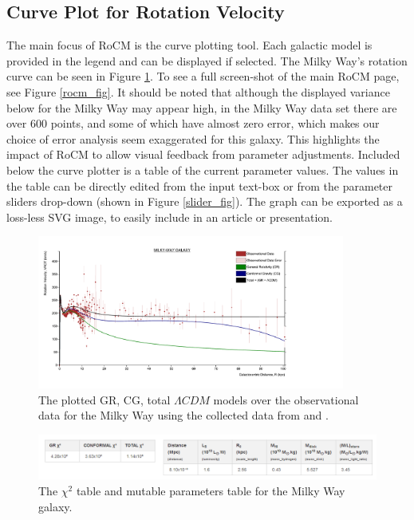\documentclass[conference]{IEEEtran-modified}
\begin{document}
\subsection{Curve Plot for Rotation Velocity}
The main focus of RoCM is the curve plotting tool. Each galactic model is provided in the legend and can be displayed if selected. The Milky Way's rotation curve can be seen in Figure \ref{milkywayplot}. To see a full screen-shot of the main RoCM page, see Figure \ref{rocm_fig}. It should be noted that although the displayed variance below for the Milky Way may appear high, in the Milky Way data set \cite{sofue} there are over 600 points, and some of which have almost zero error, which makes our choice of error analysis seem exaggerated for this galaxy. This highlights the impact of RoCM to allow visual feedback from parameter adjustments. Included below the curve plotter is a table of the current parameter values. The values in the table can be directly edited from the input text-box or from the parameter sliders drop-down (shown in Figure \ref{slider_fig}). The graph can be exported as a loss-less SVG image, to easily include in an article or presentation.

\begin{figure}[h!]
\centering
\includegraphics[width=0.9\textwidth]{MILKY-WAY}
\caption{The plotted GR, CG, total $\Lambda CDM$ models over the observational data for the Milky Way using the collected data from \cite{kundu} and \cite{sofue}.}
\label{milkywayplot}
\end{figure}

\begin{figure}[h!]
\centering
\includegraphics[width=\textwidth]{MILKY-WAY-CHI-PARAMS}
\caption{The $\chi^2$ table and mutable parameters table for the Milky Way galaxy.}
\label{param_table_fig}
\end{figure}
\end{document}
